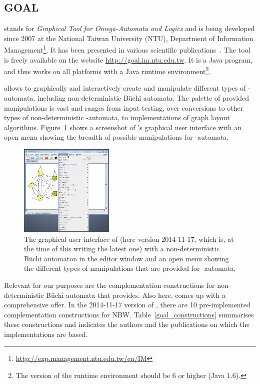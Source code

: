 \subsection{GOAL}
\label{4_goal}
\goal{} stands for \textit{Graphical Tool for Omega-Automata and Logics} and is being developed since 2007 at the National Taiwan University (NTU), Department of Information Management\footnote{\url{http://exp.management.ntu.edu.tw/en/IM}}. It has been presented in various scientific publications~\cite{2007_goal}\cite{2008_goal_ext}\cite{2009_goal}\cite{2013_goal}. The tool is freely available on the website \url{http://goal.im.ntu.edu.tw}. It is a Java program, and thus works on all platforms with a Java runtime environment\footnote{The version of the runtime environment should be 6 or higher (Java 1.6).}.

\goal{} allows to graphically and interactively create and manipulate different types of \om-automata, including non-deterministic Büchi automata. The palette of provided manipulations is vast and ranges from input testing, over conversions to other types of non-deterministic \om-automata, to implementations of graph layout algorithms. Figure~\ref{goal_gui} shows a screenshot of \goal's graphical user interface with an open menu showing the breadth of possible manipulations for \om-automata. 

\begin{figure}[htb!]
\centering
\includegraphics[width=0.4\textwidth]{figures/goal.png}
\caption{The graphical user interface of \goal{} (here version 2014-11-17, which is, at the time of this writing the latest one) with a non-deterministic Büchi automaton in the editor window and an open menu showing the different types of manipulations that are provided for \om-automata.}
\label{goal_gui}
\end{figure}

Relevant for our purposes are the complementation constructions for non-deterministic Büchi automata that \goal{} provides. Also here, \goal{} comes up with a comprehensive offer. In the 2014-11-17 version of \goal{}, there are 10 pre-implemented complementation constructions for NBW. Table~\ref{goal_constructions} summarises these constructions and indicates the authors and the publications on which the implementations are based.

